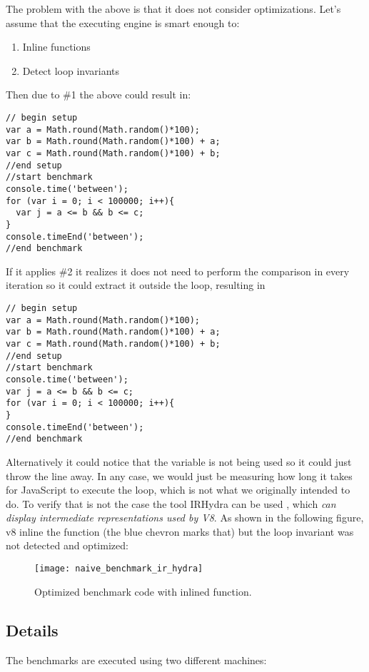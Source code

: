 The problem with the above is that it does not consider optimizations. Let's assume that the executing engine is smart enough to:
\begin{enumerate}
  \item Inline functions
  \item Detect loop invariants
\end{enumerate}

Then due to \#1 the above could result in:
\begin{lstlisting}[caption=Naive benchmark after inlining]
// begin setup
var a = Math.round(Math.random()*100);
var b = Math.round(Math.random()*100) + a;
var c = Math.round(Math.random()*100) + b;
//end setup
//start benchmark
console.time('between');
for (var i = 0; i < 100000; i++){
  var j = a <= b && b <= c;
}
console.timeEnd('between');
//end benchmark
\end{lstlisting}

If it applies \#2 it realizes it does not need to perform the comparison in every iteration so it could extract it outside the loop, resulting in
\begin{lstlisting}[caption=Naive benchmark after evaluating loop invariants]
// begin setup
var a = Math.round(Math.random()*100);
var b = Math.round(Math.random()*100) + a;
var c = Math.round(Math.random()*100) + b;
//end setup
//start benchmark
console.time('between');
var j = a <= b && b <= c;
for (var i = 0; i < 100000; i++){
}
console.timeEnd('between');
//end benchmark
\end{lstlisting}

Alternatively it could notice that the variable  is not being used so it could just throw the line away. In any case, we would just be measuring how long it takes for JavaScript to execute the loop, which is not what we originally intended to do. To verify that is not the case the tool IRHydra\cite{ir-hydra} can be used , which \textit{can display intermediate representations used by V8}. As shown in the following figure, v8 inline the function (the blue chevron marks that) but the loop invariant was not detected and optimized:
\begin{figure}[h!]
  \centering
  \texttt{[image: naive\_benchmark\_ir\_hydra]}
  \caption{Optimized benchmark code with inlined function.}
\end{figure}

\subsection{Details}
\label{sub-sec:serialization-and-transference}
The benchmarks are executed using two different machines:

